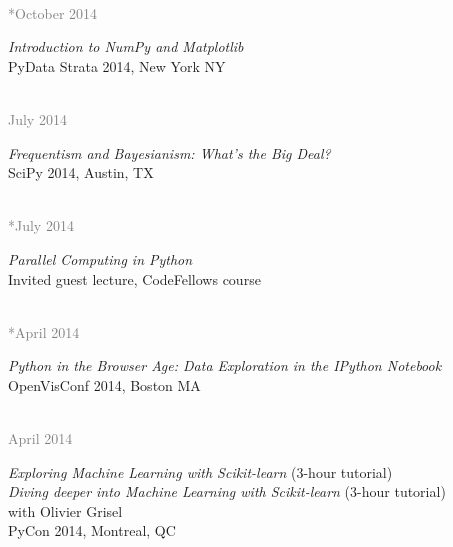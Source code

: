 \documentclass{article} %
\newlength\sidebarwidth
\newcommand{\dateonly}[2][]
	 {\begin{minipage}{\textwidth}
	 \vspace*{.4\baselineskip}
         \nopagebreak\hspace{0in}%
         \nopagebreak\begin{minipage}[t]{\sidebarwidth - .2cm}
         \raggedleft {~}
         {\\[-\baselineskip] \textcolor{gray}{\footnotesize #1}}
	 \end{minipage}%
	 \hfill
	 \begin{minipage}[t]{\linewidth - \sidebarwidth}
	 #2%
	 \end{minipage}%
	 \vspace*{.2\baselineskip plus 1\baselineskip minus
	 .2\baselineskip}%
	 \end{minipage}}
\begin{document}
  \dateonly[**October 2014]{
    {\it Introduction to NumPy and Matplotlib}\\
    PyData \@ Strata 2014, New York NY
  }

  \dateonly[July 2014]{
    {\it Frequentism and Bayesianism: What's the Big Deal?}\\
    SciPy 2014, Austin, TX
  }

  \dateonly[**July 2014]{
    {\it Parallel Computing in Python}\\
    Invited guest lecture, CodeFellows course
  }

  \dateonly[**April 2014]{
    {\it Python in the Browser Age: Data Exploration in the IPython Notebook}\\
    OpenVisConf 2014, Boston MA
  }

  \dateonly[April 2014]{
    {\it Exploring Machine Learning with Scikit-learn} (3-hour tutorial)\\
    {\it Diving deeper into Machine Learning with Scikit-learn} (3-hour tutorial)\\
    with Olivier Grisel\\
    PyCon 2014, Montreal, QC
  }
\end{document}
